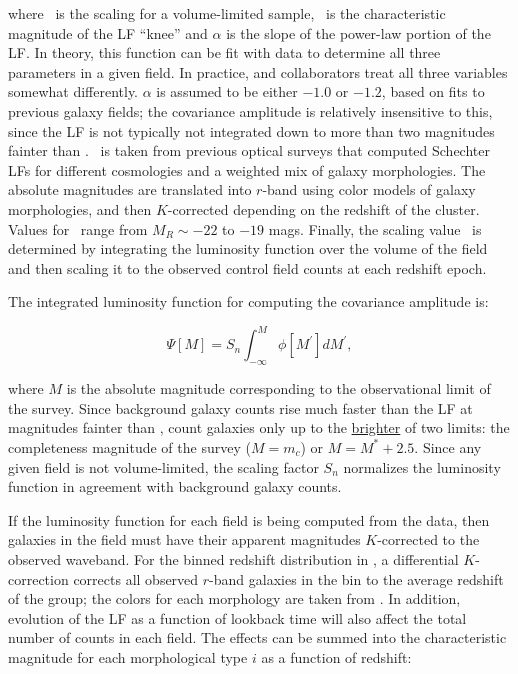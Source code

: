 \documentclass{emulateapj}
\begin{document}
\noindent where \phistar~is the scaling for a volume-limited sample, \mstar~is the characteristic magnitude of the LF ``knee'' and $\alpha$ is the slope of the power-law portion of the LF. In theory, this function can be fit with data to determine all three parameters in a given field. In practice, \citet{yee87} and collaborators treat all three variables somewhat differently. $\alpha$ is assumed to be either $-1.0$ or $-1.2$, based on fits to previous galaxy fields; the covariance amplitude is relatively insensitive to this, since the LF is not typically not integrated down to more than two magnitudes fainter than \mstar. \mstar~is taken from previous optical surveys \citep{kin85,seb86} that computed Schechter LFs for different cosmologies and a weighted mix of galaxy morphologies. The absolute magnitudes are translated into $r$-band using color models of galaxy morphologies, and then $K$-corrected depending on the redshift of the cluster. Values for \mstar~range from $M_R\sim-22$ to $-19$ mags. Finally, the scaling value \phistar~is determined by integrating the luminosity function over the volume of the field and then scaling it to the observed control field counts at each redshift epoch. 

The integrated luminosity function for computing the covariance amplitude is:

\begin{equation}
\label{eqn-schechter_int}
\Psi[M] = S_n \int_{-\infty}^{M} \phi[M^\prime] dM^\prime, 
\end{equation}

\noindent where $M$ is the absolute magnitude corresponding to the observational limit of the survey. Since background galaxy counts rise much faster than the LF at magnitudes fainter than \mstar, \citet{yee87} count galaxies only up to the \underline{brighter} of two limits: the completeness magnitude of the survey ($M=m_c$) or $M=M^* + 2.5$. Since any given field is not volume-limited, the scaling factor $S_n$ normalizes the luminosity function in agreement with background galaxy counts. 

If the luminosity function for each field is being computed from the data, then galaxies in the field must have their apparent magnitudes $K$-corrected to the observed waveband. For the binned redshift distribution in \citet{yee87}, a differential $K$-correction corrects all observed $r$-band galaxies in the bin to the average redshift of the group; the colors for each morphology are taken from \citet{seb86}. In addition, evolution of the LF as a function of lookback time will also affect the total number of counts in each field. The effects can be summed into the characteristic magnitude for each morphological type $i$ as a function of redshift:
\end{document}

